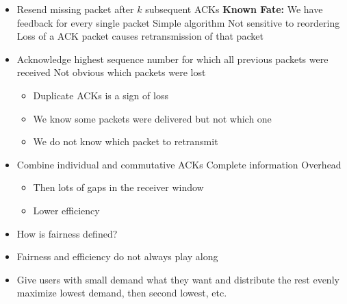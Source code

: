 \begin{itemize}
\begin{itemize}
\begin{itemize}
                    \item Resend missing packet after $k$ subsequent ACKs
                    \ipro \textbf{Known Fate:} We have feedback for every single packet
                    \ipro Simple algorithm
                    \ipro Not sensitive to reordering
                    \icon Loss of a ACK packet causes retransmission of that packet
                \end{itemize}
                \begin{itemize}
                    \item Acknowledge highest sequence number for which all previous packets were received
                    \ipro Not obvious which packets were lost
                        \begin{itemize}
                            \item Duplicate ACKs is a sign of loss
                            \item We know some packets were delivered but not which one
                            \item We do not know which packet to retransmit
                        \end{itemize}
                \end{itemize}
                \begin{itemize}
                    \item Combine individual and commutative ACKs
                    \ipro Complete information
                    \icon Overhead
                        \begin{itemize}
                            \item Then lots of gaps in the receiver window
                            \item Lower efficiency
                        \end{itemize}
                \end{itemize}
        \end{itemize}
        \begin{itemize}
            \item How is fairness defined?
            \item Fairness and efficiency do not always play along
            \item Give users with small demand what they want and distribute the rest evenly
             maximize lowest demand, then second lowest, etc.

\end{itemize}
\end{itemize}

